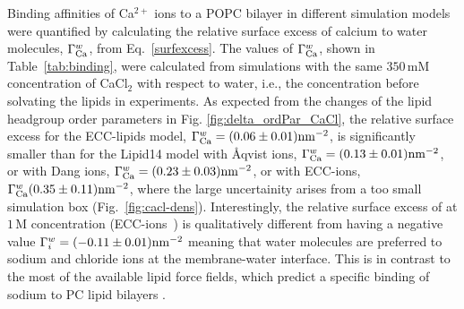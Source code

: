 \documentclass[aip,jcp,twocolumn]{revtex4}
\begin{document}
Binding affinities of Ca$^{2+}$ ions to a POPC bilayer in different simulation 
models were quantified by calculating the relative surface excess of calcium to water molecules, $\Gamma_{\rm Ca}^w$, from Eq.~\ref{surfexcess}.
The values of $\Gamma_{\rm Ca}^w$, shown in Table~\ref{tab:binding},
were calculated from simulations with the same $350\,\mathrm{mM}$ concentration of CaCl$_2$ with 
respect to water, i.e., the concentration before solvating the lipids in experiments.
As expected from the changes of the lipid headgroup order parameters in Fig. \ref{fig:delta_ordPar_CaCl}, 
the relative surface excess for the ECC-lipids model, $\Gamma_{\rm Ca}^w = (0.06 \pm 0.01) \rm{nm}^{-2}$,
is significantly smaller than for the Lipid14 model with \AA{}qvist ions, $\Gamma_{\rm Ca}^w = (0.13 \pm 0.01) \rm{nm}^{-2}$,
or with Dang ions, $\Gamma_{\rm Ca}^w = (0.23 \pm 0.03) \rm{nm}^{-2}$,
or with ECC-ions,  $\Gamma_{\rm Ca}^w (0.35 \pm 0.11) \rm{nm}^{-2}$,
where the large uncertainity arises from a too small simulation box (Fig.~\ref{fig:cacl-dens}).
Interestingly, the relative surface excess of 
 at $1\,\mathrm{M}$ concentration (ECC-ions~\cite{Pluharova2014}) 
is qualitatively different from 
having a negative value $\Gamma_i^w = (-0.11 \pm 0.01) \rm{nm}^{-2}$ 
meaning that water molecules are preferred to sodium and chloride ions at the membrane-water interface. 
This is in contrast to the most of the available lipid force fields,
which predict a specific binding of sodium to
PC lipid bilayers \cite{catte16}.
%
%
\end{document}
